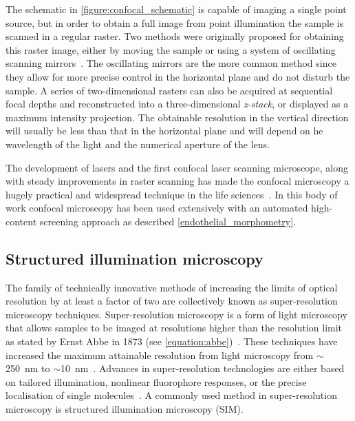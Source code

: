 The schematic in \autoref{figure:confocal_schematic} is capable of imaging a single point source, but in order to obtain a full image from point illumination the sample is scanned in a regular raster. Two methods were originally proposed for obtaining this raster image, either by moving the sample or using a system of oscillating scanning mirrors~\cite{Minsky1988}. The oscillating mirrors are the more common method since they allow for more precise control in the horizontal plane and do not disturb the sample. A series of two-dimensional rasters can also be acquired at sequential focal depths and reconstructed into a three-dimensional \emph{z-stack}, or displayed as a maximum intensity projection. The obtainable resolution in the vertical direction will usually be less than that in the horizontal plane and will depend on he wavelength of the light and the numerical aperture of the lens.

The development of lasers and the first confocal laser scanning microscope,  along with steady improvements in raster scanning has made the confocal microscopy a hugely practical and widespread technique in the life sciences~\cite{Sheppard1977}. In this body of work confocal microscopy has been used extensively with an automated high-content screening approach as described \autoref{endothelial_morphometry}.

\subsection{Structured illumination microscopy}
\label{introduction:microscopy:structured_illumination_microscopy}
The family of technically innovative methods of increasing the limits of optical resolution by at least a factor of two are collectively known as super-resolution microscopy techniques. Super-resolution microscopy is a form of light microscopy that allows samples to be imaged at resolutions higher than the resolution limit as stated by Ernst Abbe in 1873 (see \autoref{equation:abbe})~\cite{Abbe1873}. These techniques have increased the maximum attainable resolution from light microscopy from $\sim$\SI{250}{\nano\meter} to $\sim$\SI{10}{\nano\meter}~\cite{Galbraith2011}. Advances in super-resolution technologies are either based on tailored illumination, nonlinear fluorophore responses, or the precise localisation of single molecules~\cite{Schermelleh2010}. A commonly used method in super-resolution microscopy is structured illumination microscopy (SIM).

